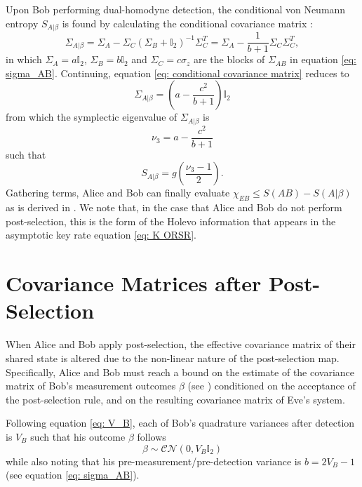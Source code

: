 ﻿\documentclass[12pt]{article}
\begin{document}
Upon Bob performing dual-homodyne detection, the conditional von Neumann entropy $S_{A|\beta}$ is found by calculating the conditional covariance matrix \cite{Laudenbach-2018}:
\begin{equation}
\label{eq: conditional covariance matrix}
\Sigma_{A|\beta}
= \Sigma_A - \Sigma_C(\Sigma_B + \mathbb{I}_2)^{-1}\Sigma_C^T
= \Sigma_A - \frac{1}{b + 1}\Sigma_C\Sigma_C^T ,
\end{equation}
in which $\Sigma_A = a\mathbb{I}_2$, $\Sigma_B=b\mathbb{I}_2$ and $\Sigma_C = c\sigma_z$ are the blocks of $\Sigma_{AB}$ in equation \eqref{eq: sigma_AB}. Continuing, equation \eqref{eq: conditional covariance matrix} reduces to
\begin{equation}
\label{eq: cond cov mat simplified}
\Sigma_{A|\beta} = \left(a-\frac{c^2}{b + 1}\right)\mathbb{I}_2
\end{equation}
from which the symplectic eigenvalue of $\Sigma_{A|\beta}$ is
\begin{equation}
\label{eq: nu_3}
\nu_3 = a - \frac{c^2}{b + 1}
\end{equation}
such that
\begin{equation}
S_{A|\beta} = g\left(\frac{\nu_3 - 1}{2}\right).
\end{equation}
Gathering terms, Alice and Bob can finally evaluate $\chi_{EB} \leq S(AB) - S(A|\beta)$ as is derived in . We note that, in the case that Alice and Bob do not perform post-selection, this is the form of the Holevo information that appears in the asymptotic key rate equation \eqref{eq: K ORSR}.

\section{Covariance Matrices after Post-Selection}
\label{app: covariance matrices after post-selection}

When Alice and Bob apply post-selection, the effective covariance matrix of their shared state is altered due to the non-linear nature of the post-selection map. Specifically, Alice and Bob must reach a bound on the estimate of the covariance matrix of Bob's measurement outcomes $\beta$ (see ) conditioned on the acceptance of the post-selection rule, and on the resulting covariance matrix of Eve's system.

Following equation \eqref{eq: V_B}, each of Bob's quadrature variances after detection is $V_B$ such that his outcome $\beta$ follows
\begin{equation}
  \label{eq: p_beta}
  \beta \sim \mathcal{CN}\left(0, V_B\mathbb{I}_2\right)
\end{equation}
while also noting that his pre-measurement/pre-detection variance is $b = 2V_B - 1$ (see equation \eqref{eq: sigma_AB}).
\end{document}
